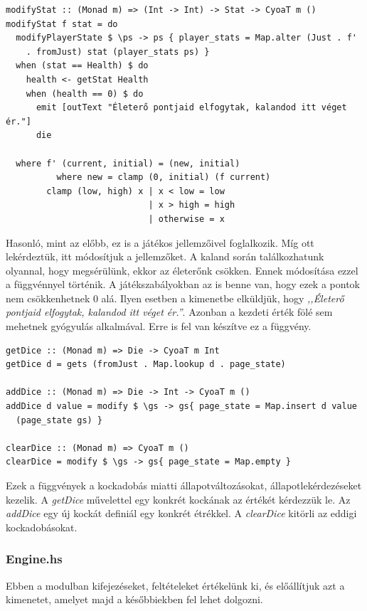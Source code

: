 \documentclass[12pt,a4paper,oneside]{report}
\begin{document}
    \begin{verbatim}
modifyStat :: (Monad m) => (Int -> Int) -> Stat -> CyoaT m ()
modifyStat f stat = do
  modifyPlayerState $ \ps -> ps { player_stats = Map.alter (Just . f'
    . fromJust) stat (player_stats ps) }
  when (stat == Health) $ do
    health <- getStat Health
    when (health == 0) $ do
      emit [outText "Életerő pontjaid elfogytak, kalandod itt véget ér."]
      die

  where f' (current, initial) = (new, initial)
          where new = clamp (0, initial) (f current)
        clamp (low, high) x | x < low = low
                            | x > high = high
                            | otherwise = x
    \end{verbatim}
    Hasonló, mint az előbb, ez is a játékos jellemzőivel
    foglalkozik. Míg ott lekérdeztük, itt módosítjuk a jellemzőket. A
    kaland során találkozhatunk olyannal, hogy megsérülünk, ekkor az
    életerőnk csökken. Ennek módosítása ezzel a függvénnyel
    történik. A játékszabályokban az is benne van, hogy ezek a pontok
    nem csökkenhetnek 0 alá. Ilyen esetben a kimenetbe elküldjük, hogy
    \emph{,,Életerő pontjaid elfogytak, kalandod itt véget ér.''}. Azonban a
    kezdeti érték fölé sem mehetnek gyógyulás alkalmával. Erre is fel
    van készítve ez a függvény.

    \begin{verbatim}
getDice :: (Monad m) => Die -> CyoaT m Int
getDice d = gets (fromJust . Map.lookup d . page_state)

addDice :: (Monad m) => Die -> Int -> CyoaT m ()
addDice d value = modify $ \gs -> gs{ page_state = Map.insert d value
  (page_state gs) }

clearDice :: (Monad m) => CyoaT m ()
clearDice = modify $ \gs -> gs{ page_state = Map.empty }
  \end{verbatim}

    Ezek a függvények a kockadobás miatti állapotváltozásokat,
    állapotlekérdezéseket kezelik. A \emph{getDice} művelettel egy konkrét
    kockának az értékét kérdezzük le. Az \emph{addDice} egy új kockát
    definiál egy konkrét étrékkel. A \emph{clearDice} kitörli az eddigi kockadobásokat.

      \subsubsection{Engine.hs}
      Ebben a modulban kifejezéseket, feltételeket értékelünk ki, és
      előállítjuk azt a kimenetet, amelyet majd a későbbiekben fel
      lehet dolgozni.
\end{document}
